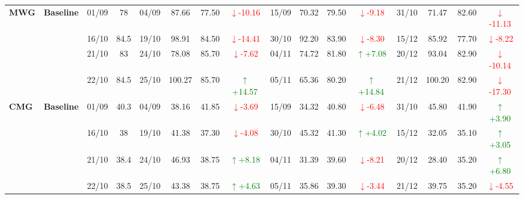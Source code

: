 {\begin{longtable}{llcc|cccc|cccc|cccc}
\multirow{4}{*}{\textbf{MWG}}
& \textbf{Baseline}
& 01/09 & 78 & 04/09 & 87.66 & 77.50 & \textcolor{red}{\(\downarrow\)-10.16} & 15/09 & 70.32 & 79.50 & \textcolor{red}{\(\downarrow\)-9.18} & 31/10 & 71.47 & 82.60 & \textcolor{red}{\(\downarrow\)-11.13} \\
& & 16/10 & 84.5 & 19/10 & 98.91 & 84.50 & \textcolor{red}{\(\downarrow\)-14.41} & 30/10 & 92.20 & 83.90 & \textcolor{red}{\(\downarrow\)-8.30} & 15/12 & 85.92 & 77.70 & \textcolor{red}{\(\downarrow\)-8.22} \\
& & 21/10 & 83 & 24/10 & 78.08 & 85.70 & \textcolor{red}{\(\downarrow\)-7.62} & 04/11 & 74.72 & 81.80 & \textcolor{green}{\(\uparrow\)+7.08} & 20/12 & 93.04 & 82.90 & \textcolor{red}{\(\downarrow\)-10.14} \\
& & 22/10 & 84.5 & 25/10 & 100.27 & 85.70 & \textcolor{green}{\(\uparrow\)+14.57} & 05/11 & 65.36 & 80.20 & \textcolor{green}{\(\uparrow\)+14.84} & 21/12 & 100.20 & 82.90 & \textcolor{red}{\(\downarrow\)-17.30} \\
\midrule

\multirow{4}{*}{\textbf{CMG}}
& \textbf{Baseline}
& 01/09 & 40.3 & 04/09 & 38.16 & 41.85 & \textcolor{red}{\(\downarrow\)-3.69} & 15/09 & 34.32 & 40.80 & \textcolor{red}{\(\downarrow\)-6.48} & 31/10 & 45.80 & 41.90 & \textcolor{green}{\(\uparrow\)+3.90} \\
& & 16/10 & 38 & 19/10 & 41.38 & 37.30 & \textcolor{red}{\(\downarrow\)-4.08} & 30/10 & 45.32 & 41.30 & \textcolor{green}{\(\uparrow\)+4.02} & 15/12 & 32.05 & 35.10 & \textcolor{green}{\(\uparrow\)+3.05} \\
& & 21/10 & 38.4 & 24/10 & 46.93 & 38.75 & \textcolor{green}{\(\uparrow\)+8.18} & 04/11 & 31.39 & 39.60 & \textcolor{red}{\(\downarrow\)-8.21} & 20/12 & 28.40 & 35.20 & \textcolor{green}{\(\uparrow\)+6.80} \\
& & 22/10 & 38.5 & 25/10 & 43.38 & 38.75 & \textcolor{green}{\(\uparrow\)+4.63} & 05/11 & 35.86 & 39.30 & \textcolor{red}{\(\downarrow\)-3.44} & 21/12 & 39.75 & 35.20 & \textcolor{red}{\(\downarrow\)-4.55} \\
\midrule


\end{longtable}}
